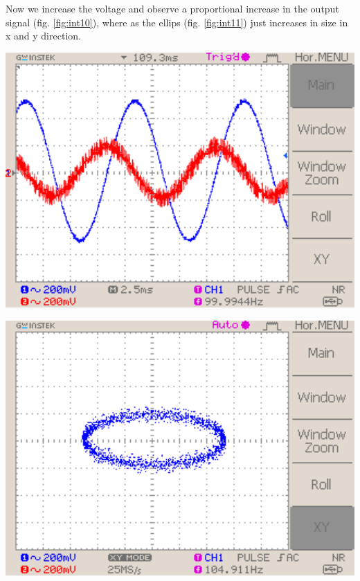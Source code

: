 \documentclass[a4paper,10pt]{article}
\newenvironment{Figure}
        {\par\medskip\noindent\minipage{\linewidth}}
        {\endminipage\par\medskip}
\numberwithin{equation}{section}
\begin{document}
\begin{multicols}{2}
	Now we increase the voltage and observe a proportional increase in the output signal (fig. \ref{fig:int10}), where as the ellips (fig. \ref{fig:int11}) just increases in size in x and y direction.
	\begin{Figure}
		\centering
		\includegraphics[width=1\textwidth]{../data/DS0043_n.png}
		\label{fig:int10}
	\end{Figure}
	\begin{Figure}
		\centering
		\includegraphics[width=1\textwidth]{../data/DS0042_n.png}
		\label{fig:int11}
	\end{Figure}


\end{multicols}
\end{document}
